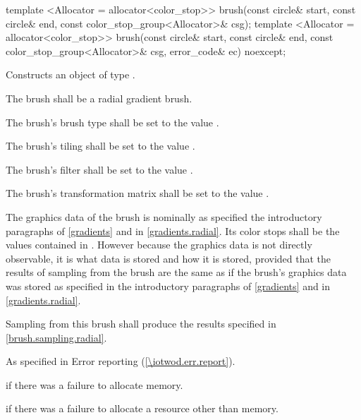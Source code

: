 \begin{itemdecl}
template <Allocator = allocator<color_stop>>
brush(const circle& start, const circle& end,
  const color_stop_group<Allocator>& csg);
template <Allocator = allocator<color_stop>>
brush(const circle& start, const circle& end,
  const color_stop_group<Allocator>& csg, error_code& ec) noexcept;
\end{itemdecl}
\begin{itemdescr}
\pnum
\effects
Constructs an object of type .

\pnum
The brush shall be a radial gradient brush.

\pnum
The brush's brush type shall be set to the value .

\pnum
The brush's tiling shall be set to the value .

\pnum
The brush's filter shall be set to the value .

\pnum
The brush's transformation matrix shall be set to the value .

\pnum
The graphics data of the brush is nominally as specified the introductory paragraphs of \ref{gradients} and in \ref{gradients.radial}. Its color stops shall be the values contained in . However because the graphics data is not directly observable, it is \unspecnorm what data is stored and how it is stored, provided that the results of sampling from the brush are the same as if the brush's graphics data was stored as specified in the introductory paragraphs of \ref{gradients} and in \ref{gradients.radial}.

\pnum
\remarks
Sampling from this brush shall produce the results specified in \ref{brush.sampling.radial}.

\pnum
\throws
As specified in Error reporting (\ref{\iotwod.err.report}).

\pnum
\errors
{} if there was a failure to allocate memory.

 if there was a failure to allocate a resource other than memory.
\end{itemdescr}

